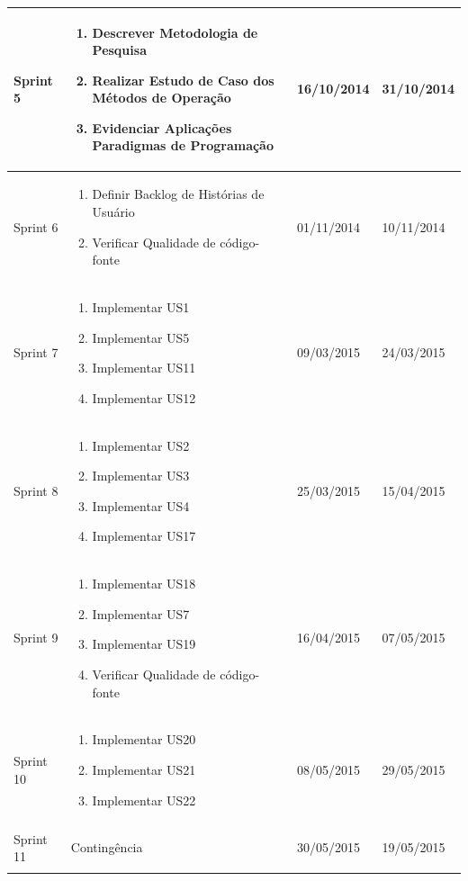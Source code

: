 \begin{center}
\begin{longtable}{  | p{2cm} | p{8cm} | p{2cm}| p{2cm} |}
    Sprint 5 & \begin{enumerate}
    \item Descrever Metodologia de Pesquisa
    \item Realizar Estudo de Caso dos  Métodos de Operação
    \item Evidenciar Aplicações Paradigmas de Programação
    \end{enumerate} & 16/10/2014 & 31/10/2014\\ \hline
    
    Sprint 6 & \begin{enumerate}
    \item Definir Backlog de Histórias de Usuário
    \item Verificar Qualidade de código-fonte
    \end{enumerate} & 01/11/2014 & 10/11/2014\\ \hline

    Sprint 7 & \begin{enumerate}
    \item Implementar US1
    \item Implementar US5
    \item Implementar US11
    \item Implementar US12
    \end{enumerate} & 09/03/2015 & 24/03/2015\\ \hline

    Sprint 8 & \begin{enumerate}
    \item Implementar US2
    \item Implementar US3
    \item Implementar US4
    \item Implementar US17
    \end{enumerate} & 25/03/2015 & 15/04/2015\\ \hline

    Sprint 9 & \begin{enumerate}
    \item Implementar US18
    \item Implementar US7
    \item Implementar US19
    \item Verificar Qualidade de código-fonte
    \end{enumerate} & 16/04/2015 & 07/05/2015\\ \hline

    Sprint 10 & \begin{enumerate}
    \item Implementar US20
    \item Implementar US21
    \item Implementar US22
    \end{enumerate} & 08/05/2015 & 29/05/2015\\ \hline

    Sprint 11 & Contingência & 30/05/2015 & 19/05/2015

\label{cronograma}
\end{longtable}
\end{center}

